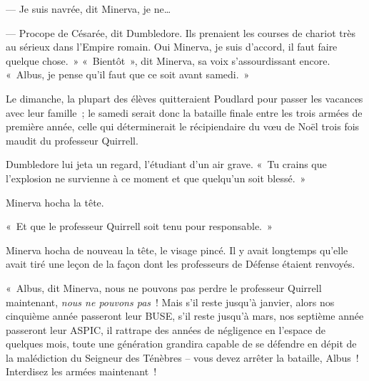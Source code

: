 --- Je suis navrée, dit Minerva, je ne…

--- Procope de Césarée\footnotemark{}, dit Dumbledore.
Ils prenaient les courses de chariot très au sérieux dans l'Empire romain.
Oui Minerva, je suis d'accord, il faut faire quelque chose.~»
«~Bientôt~», dit Minerva, sa voix s'assourdissant encore.
«~Albus, je pense qu'il faut que ce soit avant samedi.~»

Le dimanche, la plupart des élèves quitteraient Poudlard pour passer les vacances avec leur famille~; le samedi serait donc la bataille finale entre les trois armées de première année, celle qui déterminerait le récipiendaire du vœu de Noël trois fois maudit du professeur Quirrell.

Dumbledore lui jeta un regard, l'étudiant d'un air grave.
«~Tu crains que l'explosion ne survienne à ce moment et que quelqu'un soit blessé.~»

Minerva hocha la tête.

«~Et que le professeur Quirrell soit tenu pour responsable.~»

Minerva hocha de nouveau la tête, le visage pincé.
Il y avait longtemps qu'elle avait tiré une leçon de la façon dont les professeurs de Défense étaient renvoyés.

«~Albus, dit Minerva, nous ne pouvons pas perdre le professeur Quirrell maintenant, \emph{nous ne pouvons pas}~!
Mais s'il reste jusqu'à janvier, alors nos cinquième année passeront leur BUSE, s'il reste jusqu'à mars, nos septième année passeront leur ASPIC, il rattrape des années de négligence en l'espace de quelques mois, toute une génération grandira capable de se défendre en dépit de la malédiction du Seigneur des Ténèbres -- vous devez arrêter la bataille, Albus~!
Interdisez les armées maintenant~!

